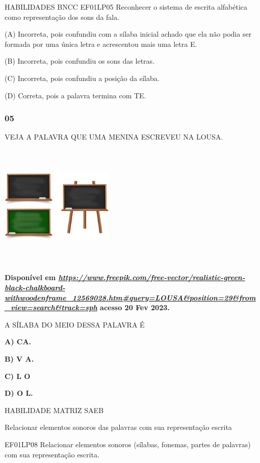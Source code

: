 \begin{escola}
HABILIDADES BNCC EF01LP05 Reconhecer o sistema de escrita alfabética
como representação dos sons da fala.

(A) Incorreta, pois confundiu com a sílaba inicial achado que ela não
podia ser formada por uma única letra e acrescentou mais uma letra E.

(B) Incorreta, pois confundiu os sons das letras.

(C) Incorreta, pois confundiu a posição da sílaba.

(D) Correta, pois a palavra termina com TE.

\subsubsection{05}\label{section-61}

VEJA A PALAVRA QUE UMA MENINA ESCREVEU NA LOUSA.

\includegraphics[width=2.13044in,height=2.33234in]{media/image231.jpg}

\textbf{Disponível em
\href{https://www.freepik.com/free-vector/realistic-green-black-chalkboard-withwoodenframe_12569028.htm\#query=LOUSA\&position=29\&from_view=search\&track=sph}{\emph{https://www.freepik.com/free-vector/realistic-green-black-chalkboard-withwoodenframe\_12569028.htm\#query=LOUSA\&position=29\&from\_view=search\&track=sph}}
acesso 20 Fev 2023.}

A SÍLABA DO MEIO DESSA PALAVRA É

\textbf{A) CA.}

\textbf{B) V A.}

\textbf{C) L O}

\textbf{D) O L.}

HABILIDADE MATRIZ SAEB

Relacionar elementos sonoros das palavras com sua representação escrita

EF01LP08 Relacionar elementos sonoros (sílabas, fonemas, partes de
palavras) com sua representação escrita.


\end{escola}
